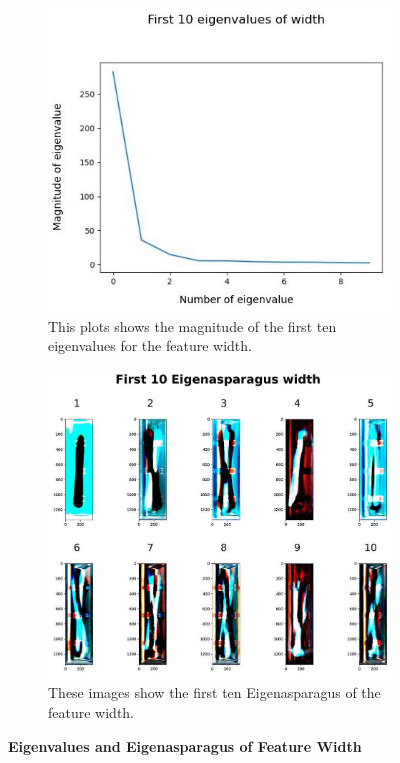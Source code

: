 \begin{figure}[!h]
	\centering
	\begin{subfigure}{0.7\textwidth}
		\includegraphics[width=0.9\linewidth]{Figures/chapter04/pca_width_graph.png} 
		\caption{This plots shows the magnitude of the first ten eigenvalues for the feature width.}
	\end{subfigure}
	\vspace{20pt}
	
	\begin{subfigure}{0.9\textwidth}
		\includegraphics[width=0.9\linewidth]{Figures/chapter04/pca_width.png}
		\caption{These images show the first ten Eigenasparagus of the feature width.}
	\end{subfigure}
    \caption[First Ten Eigenvalues and Eigenasparagus of Feature Width]{\textbf{Eigenvalues and Eigenasparagus of Feature Width}}
    \label{fig:PCAwidth}
\end{figure}


